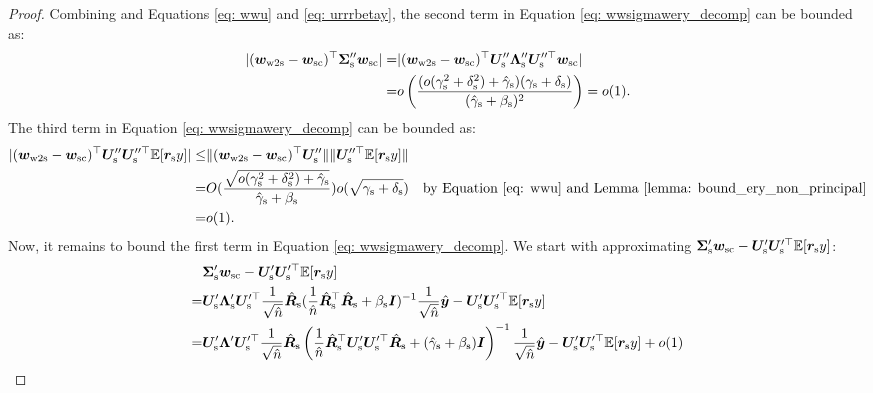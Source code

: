 \begin{proof}
Combining \dimini{} and Equations \ref{eq: wwu} and \ref{eq: urrrbetay}, the second term in Equation \ref{eq: wwsigmawery_decomp} can be bounded as:
\begin{align}
    \nonumber
   | ({\bm{w}}_{\text{w2s}}- {\bm{w}}_{\text{sc}})^\top {\bm{\Sigma}}_{\text{s}}''{\bm{w}}_{\text{sc}} | 
  = & | ({\bm{w}}_{\text{w2s}}- {\bm{w}}_{\text{sc}})^\top {\bm{U}}_{\text{s}}''{\bm{\Lambda}}_{\text{s}}''{\bm{U}}_{\text{s}}''^\top{\bm{w}}_{\text{sc}} |  \\
  \label{eq: wwsigmaw_o1}
  = & o\left(\frac{  (o(\gamma_{\text{s}}^2+\delta_{\text{s}}^2)+\hat{\gamma}_{\text{s}} ) (\gamma_{\text{s}}+\delta_{\text{s}}) }{(\hat{\gamma}_{\text{s}}+\beta_{\text{s}})^2}\right) = o(1).
\end{align}
The third term in Equation \ref{eq: wwsigmawery_decomp} can be bounded as:
\begin{align}
    \nonumber
|({\bm{w}}_{\text{w2s}}- {\bm{w}}_{\text{sc}})^\top{\bm{U}}_{\text{s}}''{\bm{U}}_{\text{s}}''^\top\mathbb{E} [{\bm{r}}_{\text{s}} y] |\leq &     \|({\bm{w}}_{\text{w2s}}- {\bm{w}}_{\text{sc}})^\top{\bm{U}}_{\text{s}}''\|\|{\bm{U}}_{\text{s}}''^\top\mathbb{E} [{\bm{r}}_{\text{s}} y]\|\\
\nonumber
= & O( \frac{\sqrt{o(\gamma_{\text{s}}^2+\delta_{\text{s}}^2)+\hat{\gamma}_{\text{s}}}}{\hat{\gamma}_{\text{s}}+\beta_{\text{s}}} ) o(\sqrt{\gamma_{\text{s}}+\delta_{\text{s}}})\quad\text{by Equation \ref{eq: wwu} and Lemma \ref{lemma: bound_ery_non_principal}}\\
\label{eq: wwuuery_o1}
= & o(1).
\end{align}
Now, it remains to bound the first term in Equation \ref{eq: wwsigmawery_decomp}. We start with approximating ${\bm{\Sigma}}_{\text{s}}' {\bm{w}}_{\text{sc}}-{\bm{U}}_{\text{s}}'{\bm{U}}_{\text{s}}'^\top\mathbb{E} [{\bm{r}}_{\text{s}} y]$:
\begin{align}
    \nonumber
    & \mSigma_\s' \vw_\sceiling-\mU_\s'\mU_\s'^\top\E [\vr_\s y]\\
    \nonumber
    = & \mU_\s'\mLambda_\s'\mU_\s'^\top \frac{1}{\sqrt{\hat{n}}}\hat{\mR}_\s ( \frac{1}{\hat{n}}\hat{\mR}_\s^\top \hat{\mR}_\s +\beta_\s \mI )^{-1} \frac{1}{\sqrt{\hat{n}}} \hat{\vy} -\mU_\s'\mU_\s'^\top\E [\vr_\s y]\\
    \nonumber
    =  &  \mU_\s'\mLambda'\mU_\s'^\top \frac{1}{\sqrt{\hat{n}}}\hat{\mR}_\s  \left(\frac{1}{\hat{n}}\hat{\mR}_\s^\top\mU_\s'\mU_\s'^\top\hat{\mR}_\s + (\hat{\gamma}_\s+\beta_\s)\mI  \right)^{-1} \frac{1}{\sqrt{\hat{n}}} \hat{\vy} -\mU_\s'\mU_\s'^\top\E [\vr_\s y]+ o(1) \\

\end{align}
\end{proof}
